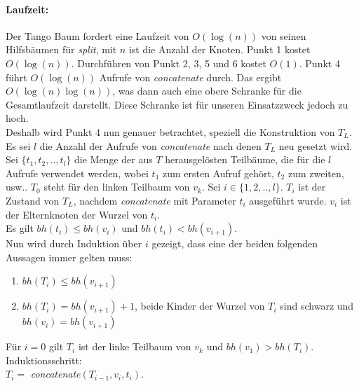 \documentclass[a4paper,12pt]{article}
\begin{document}
\paragraph{Laufzeit:}
Der Tango Baum fordert eine Laufzeit von $O(\log(n))$ von seinen Hilfsbäumen für \textit{split}, mit $n$ ist die Anzahl der Knoten. Punkt 1 kostet $O(\log(n))$. Durchführen von Punkt 2, 3, 5 und 6 kostet $O(1)$. Punkt 4 führt $O(\log (n))$ Aufrufe von \textit{concatenate} durch. Das ergibt $O(\log (n) \log (n))$, was dann auch eine obere Schranke für die Gesamtlaufzeit darstellt. Diese Schranke ist für unseren Einsatzzweck jedoch zu hoch.\\ Deshalb wird Punkt 4 nun genauer betrachtet, speziell die Konstruktion von $T_L$. Es sei $l$ die Anzahl der Aufrufe von \textit{concatenate} nach denen $T_L$ neu gesetzt wird. Sei $\{t_1,t_2,..,t_l\}$ die Menge der aus $T$ herausgelösten Teilbäume, die für die $l$ Aufrufe verwendet werden, wobei $t_1$ zum ersten Aufruf gehört, $t_2$ zum zweiten, usw.. $T_0$ steht für den linken Teilbaum von $v_k$.  Sei $i \in \{1, 2, .., l\}$. $T_i$ ist der Zustand von $T_L$, nachdem \textit{concatenate} mit Parameter $t_i$ ausgeführt wurde. $v_i$ ist der Elternknoten der Wurzel von $t_i$.\\

\noindent
Es gilt $\mathit{bh} \left(t_i \right) \leq \mathit{bh} \left(v_{i} \right)$ und $\mathit{bh} \left(t_i \right) < \mathit{bh} \left(v_{i+1} \right)$.\\
Nun wird durch Induktion über $i$ gezeigt, dass eine der beiden folgenden Aussagen immer gelten muss:\\
\bigskip
\begin{enumerate}
	\item  $\mathit{bh} \left(T_{i} \right) \leq  \mathit{bh} \left(v_{i+1} \right)$
	\item $\mathit{bh} \left(T_{i} \right) =  \mathit{bh} \left(v_{i+1} \right) +1$, beide Kinder der Wurzel von $T_i$ sind schwarz und $\mathit{bh} \left(v_{i} \right) = \mathit{bh} \left(v_{i+1} \right)$
\end{enumerate}
 
\noindent Für $i = 0$ gilt $T_i$ ist der linke Teilbaum von $v_k$ und $\mathit{bh} \left(v_{1} \right) > \mathit{bh} \left(T_{i} \right)$.\\
Induktionsschritt:\\
$T_i =$ \textit{concatenate}$\left(T_{i-1}, v_i, t_i\right)$.\\
\end{document}

